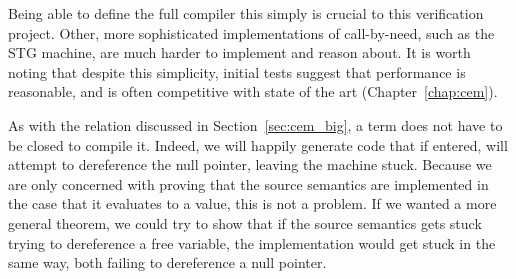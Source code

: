 Being able to define the full compiler this simply is crucial to this
verification project. Other, more sophisticated implementations of call-by-need,
such as the STG machine, are much harder to implement and reason about. It is
worth noting that despite this simplicity, initial tests suggest that performance
is reasonable, and is often competitive with state of the art
(Chapter~\ref{chap:cem}). 

As with the relation discussed in Section~\ref{sec:cem_big}, a term does not
have to be closed to compile it. Indeed, we will happily generate code that if
entered, will attempt to dereference the null pointer, leaving the machine
stuck. Because we are only concerned with proving that the source semantics are
implemented in the case that it evaluates to a value, this is not a problem. If
we wanted a more general theorem, we could try to show that if the source
semantics gets stuck trying to dereference a free variable, the implementation
would get stuck in the same way, both failing to dereference a null pointer.  
